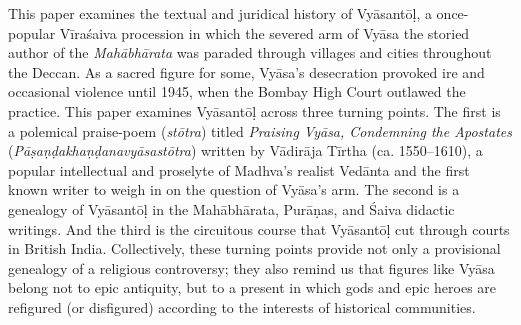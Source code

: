 This paper examines the textual and juridical history of Vyāsantōḷ, a once-popular Vīraśaiva procession in which the severed arm of Vyāsa \Dash the storied author of the \emph{Mahābhārata} \Dash was paraded through villages and cities throughout the Deccan. As a sacred figure for some, Vyāsa’s desecration provoked ire and occasional violence until 1945, when the Bombay High Court outlawed the practice. This paper examines Vyāsantōḷ across three turning points. The first is a polemical praise-poem (\emph{stōtra}) titled \emph{Praising Vyāsa, Condemning the Apostates} (\emph{Pāṣaṇḍakhaṇḍanavyāsastōtra}) written by Vādirāja Tīrtha (ca. 1550–1610), a popular intellectual and proselyte of Madhva’s realist Vedānta and the first known writer to weigh in on the question of Vyāsa’s arm. The second is a genealogy of Vyāsantōḷ in the Mahābhārata, Purāṇas, and Śaiva didactic writings. And the third is the circuitous course that Vyāsantōḷ cut through courts in British India. Collectively, these turning points provide not only a provisional genealogy of a religious controversy; they also remind us that figures like Vyāsa belong not to epic antiquity, but to a present in which gods and epic heroes are refigured (or disfigured) according to the interests of historical communities.